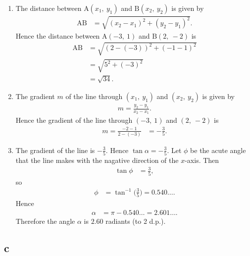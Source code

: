 \documentclass{article}
\begin{document}
\begin{enumerate}
	\item The distance between $\mathrm A(x_1,~y_1)$ and $\mathrm B(x_2,~y_2)$ is given by
	      \begin{align*}
		      \mathrm {AB} & = \sqrt{{(x_2-x_1)}^2 + {(y_2-y_1)}^2} \mathrm.
	      \end{align*}
	      Hence the distance between $\mathrm A (-3,~1)$ and $\mathrm B (2,~-2)$ is
	      \begin{align*}
		      \mathrm {AB} & = \sqrt{{(2-(-3))}^2 + {(-1-1)}^2} \\
		                   & = \sqrt {5^2 + (-3)^2}             \\
		                   & = \sqrt {34}\mathrm .
	      \end{align*}

	\item The gradient $m$ of the line through $(x_1,~y_1)$ and $(x_2,~y_2)$ is given by
	      \begin{align*}
		      m = \frac {y_2 - y_1} {x_2 - x_1} \mathrm .
	      \end{align*}
	      Hence the gradient of the line through $(-3,~1)$ and $(2,~-2)$ is
	      \begin{align*}
		      m = \frac {-2-1} {2-(-3)} & = -\frac 35\mathrm .
	      \end{align*}

	\item The gradient of the line is $-\frac 35$. Hence $\tan \alpha = - \frac 35$.
	      Let $\phi$ be the acute angle that the line makes with the nagative direction of the $x$-axis. Then
	      \begin{align*}
		      \tan \phi & = \frac 35 \mathrm ,
	      \end{align*}
	      so
	      \begin{align*}
		      \phi & = \tan^{-1} \Big( \frac 35 \Big) = 0.540\dots\mathrm .
	      \end{align*}
	      Hence
	      \begin{align*}
		      \alpha & = \pi - 0.540\dots = 2.601 \dots \mathrm .
	      \end{align*}
	      Therefore the angle $\alpha$ is $2.60$ radiants (to 2 d.p.).
\end{enumerate}

\subsection{c}
\end{document}
